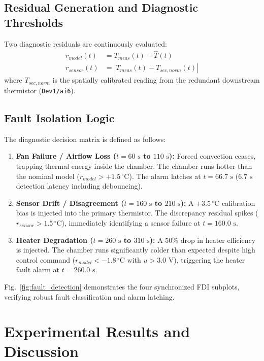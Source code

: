 \documentclass[conference]{IEEEtran}
\begin{document}
\subsection{Residual Generation and Diagnostic Thresholds}
Two diagnostic residuals are continuously evaluated:
\begin{align}
r_{model}(t) &= T_{meas}(t) - \hat{T}(t) \\
r_{sensor}(t) &= |T_{meas}(t) - T_{sec,norm}(t)|
\end{align}
where $T_{sec,norm}$ is the spatially calibrated reading from the redundant downstream thermistor (\texttt{Dev1/ai6}).

\subsection{Fault Isolation Logic}
The diagnostic decision matrix is defined as follows:
\begin{enumerate}
    \item \textbf{Fan Failure / Airflow Loss ($t = 60\text{ s}$ to $110\text{ s}$):} Forced convection ceases, trapping thermal energy inside the chamber. The chamber runs hotter than the nominal model ($r_{model} > +1.5\,^\circ\text{C}$). The alarm latches at $t = 66.7\text{ s}$ ($6.7\text{ s}$ detection latency including debouncing).
    \item \textbf{Sensor Drift / Disagreement ($t = 160\text{ s}$ to $210\text{ s}$):} A $+3.5\,^\circ\text{C}$ calibration bias is injected into the primary thermistor. The discrepancy residual spikes ($r_{sensor} > 1.5\,^\circ\text{C}$), immediately identifying a sensor failure at $t = 160.0\text{ s}$.
    \item \textbf{Heater Degradation ($t = 260\text{ s}$ to $310\text{ s}$):} A $50\%$ drop in heater efficiency is injected. The chamber runs significantly colder than expected despite high control command ($r_{model} < -1.8\,^\circ\text{C}$ with $u > 3.0\text{ V}$), triggering the heater fault alarm at $t = 260.0\text{ s}$.
\end{enumerate}

Fig.~\ref{fig:fault_detection} demonstrates the four synchronized FDI subplots, verifying robust fault classification and alarm latching.

\section{Experimental Results and Discussion}
\end{document}
